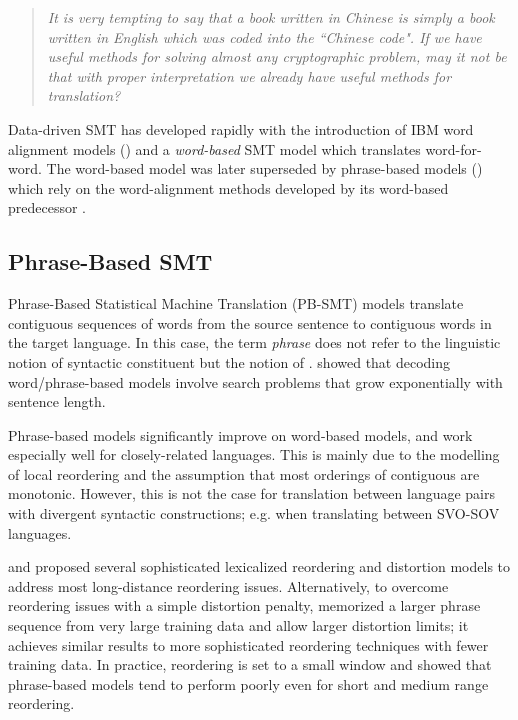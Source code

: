 \blockquote{\emph{It is very tempting to say that a book written in Chinese is simply a book written in English which was coded into the ``Chinese code". If we have useful methods for solving almost any cryptographic problem, may it not be that with proper interpretation we already have useful methods for translation?}}

Data-driven SMT has developed rapidly with the introduction of IBM word alignment models (\citealp{brown1990statistical,brown1993mathematics}) and a \emph{word-based} SMT model which translates word-for-word. The word-based model was later superseded by  phrase-based models (\citealp{ochneymaxentsmt,marcu2002phrase,zens2002phrase,koehn2003statistical,koehn2004pharaoh}) which rely on the word-alignment methods developed by its word-based predecessor \citep{al1999statistical}.

\subsection{Phrase-Based SMT}

Phrase-Based Statistical Machine Translation (PB-SMT) models translate contiguous sequences of words from the source sentence to contiguous words in the target language. In this case, the term \emph{phrase} does not refer to the linguistic notion of syntactic constituent but the notion of \ngrams. \cite{knight1999decoding} showed that decoding word/phrase-based models involve search problems that grow exponentially with sentence length.

Phrase-based models significantly improve on word-based models, and work especially well for closely-related languages. This is mainly due to the modelling of local reordering and the assumption that most orderings of contiguous \ngrams are monotonic. However, this is not the case for translation between language pairs with divergent syntactic constructions; e.g. when translating between SVO-SOV languages. 

\cite{tillmann2004unigram} and \cite{al2006distortion} proposed several sophisticated lexicalized reordering and distortion models to address most long-distance reordering issues. Alternatively, to overcome reordering issues with a simple distortion penalty, \cite{zollmann2008systematic} memorized a larger phrase \ngram sequence from very large training data and allow larger distortion limits; it achieves similar results to more sophisticated reordering techniques with fewer training data. In practice, reordering is set to a small window and \cite{birch2010metrics} showed that phrase-based models tend to perform poorly even for short and medium range reordering.

